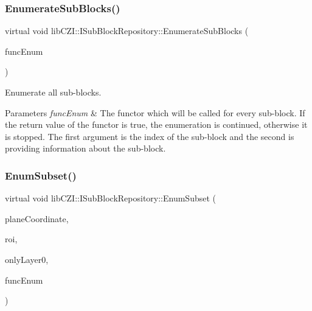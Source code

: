 \subsubsection{\texorpdfstring{Enumerate\+Sub\+Blocks()}{EnumerateSubBlocks()}}
{\footnotesize\ttfamily virtual void lib\+C\+Z\+I\+::\+I\+Sub\+Block\+Repository\+::\+Enumerate\+Sub\+Blocks (\begin{DoxyParamCaption}\item[{std\+::function$<$ bool(int index, const \hyperlink{structlib_c_z_i_1_1_sub_block_info}{Sub\+Block\+Info} \&info)$>$}]{func\+Enum }\end{DoxyParamCaption})\hspace{0.3cm}{\ttfamily [pure virtual]}}

Enumerate all sub-\/blocks. 
\begin{DoxyParams}{Parameters}
{\em func\+Enum} & The functor which will be called for every sub-\/block. If the return value of the functor is true, the enumeration is continued, otherwise it is stopped. The first argument is the index of the sub-\/block and the second is providing information about the sub-\/block. \\
\hline
\end{DoxyParams}
\mbox{\label{classlib_c_z_i_1_1_i_sub_block_repository_abf5c6fe4c21dde7079ac9c5aa04a760f}} 
\subsubsection{\texorpdfstring{Enum\+Subset()}{EnumSubset()}}
{\footnotesize\ttfamily virtual void lib\+C\+Z\+I\+::\+I\+Sub\+Block\+Repository\+::\+Enum\+Subset (\begin{DoxyParamCaption}\item[{const \hyperlink{classlib_c_z_i_1_1_i_dim_coordinate}{I\+Dim\+Coordinate} $\ast$}]{plane\+Coordinate,  }\item[{const \hyperlink{structlib_c_z_i_1_1_int_rect}{Int\+Rect} $\ast$}]{roi,  }\item[{bool}]{only\+Layer0,  }\item[{std\+::function$<$ bool(int index, const \hyperlink{structlib_c_z_i_1_1_sub_block_info}{Sub\+Block\+Info} \&info)$>$}]{func\+Enum }\end{DoxyParamCaption})\hspace{0.3cm}{\ttfamily [pure virtual]}}

